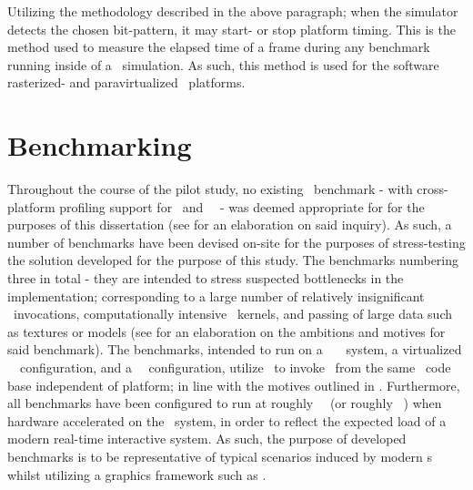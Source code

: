 \noindent
Utilizing the methodology described in the above paragraph; when the simulator detects the chosen bit-pattern, it may start- or stop platform timing.
This is the method used to measure the elapsed time of a frame during any benchmark running inside of a \dvttermsimics\ simulation.
As such, this method is used for the software rasterized- and paravirtualized \dvttermsimics\ platforms. 




\section{Benchmarking}
\label{sec:methodologyexperiment_benchmarking}
Throughout the course of the pilot study, no existing \dvttermopenglestwopointo\ benchmark - with cross-platform profiling support for \dvttermandroid\ and \dvttermxeleven\ \dvttermlinux\ - was deemed appropriate for for the purposes of this dissertation (see  for an elaboration on said inquiry).
As such, a number of benchmarks have been devised on-site for the purposes of stress-testing the solution developed for the purpose of this study.
The benchmarks numbering three in total - they are intended to stress suspected bottlenecks in the implementation; corresponding to a large number of relatively insignificant \dvttermopengl\ invocations, computationally intensive \dvttermgpu\ kernels, and passing of large data such as textures or models (see  for an elaboration on the ambitions and motives for said benchmark).
The benchmarks, intended to run on a \dvttermhost\ \dvttermfedora\ \dvttermlinux\ system, a virtualized \dvttermsimics\ \dvttermfedora\ configuration, and a \dvttermqemu\ \dvttermandroid\ configuration, utilize \dvttermjni\ to invoke \dvttermopengles\ from the same \dvttermc\ code base independent of platform; in line with the motives outlined in .
Furthermore, all benchmarks have been configured to run at roughly ~\milli\second\ (or roughly ~\dvttermfps ) when hardware accelerated on the \dvttermhost\ system, in order to reflect the expected load of a modern real-time interactive system.
As such, the purpose of developed benchmarks is to be representative of typical scenarios induced by modern \dvttermgui s whilst utilizing a graphics framework such as \dvttermopengl .

